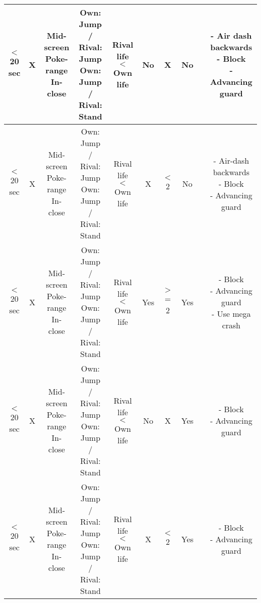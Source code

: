 \documentclass{article}
\begin{document}
\begin{landscape}
\begin{table}[h!]
\begin{center}
\begin{tabular*}{27cm}{c|c|c|c|c|c|c|c|c|c}
      \hline
      $<$ 20 sec & X & \makecell{Mid-screen \\ Poke-range \\ In-close} & \makecell{Own: Jump / Rival: Jump \\ Own: Jump / Rival: Stand} & Rival life $<$ Own life & No & X & No & & \makecell{- Air dash backwards \\ - Block \\ - Advancing guard}\\
      \hline
      $<$ 20 sec & X & \makecell{Mid-screen \\ Poke-range \\ In-close} & \makecell{Own: Jump / Rival: Jump \\ Own: Jump / Rival: Stand} & Rival life $<$ Own life & X & $<$ 2 & No & & \makecell{- Air-dash backwards \\ - Block \\ - Advancing guard}\\
      \hline
      $<$ 20 sec & X & \makecell{Mid-screen \\ Poke-range \\ In-close} & \makecell{Own: Jump / Rival: Jump \\ Own: Jump / Rival: Stand} & Rival life $<$ Own life & Yes & $>$= 2 & Yes & & \makecell{- Block \\ - Advancing guard \\ - Use mega crash}\\
      \hline
      $<$ 20 sec & X & \makecell{Mid-screen \\ Poke-range \\ In-close} & \makecell{Own: Jump / Rival: Jump \\ Own: Jump / Rival: Stand} & Rival life $<$ Own life & No & X & Yes & & \makecell{- Block \\ - Advancing guard}\\
      \hline
      $<$ 20 sec & X & \makecell{Mid-screen \\ Poke-range \\ In-close} & \makecell{Own: Jump / Rival: Jump \\ Own: Jump / Rival: Stand} & Rival life $<$ Own life & X & $<$ 2 & Yes & & \makecell{- Block \\ - Advancing guard}\\
      \hline
\end{tabular*}
  \end{center}
\end{table}

\end{landscape}
\end{document}
